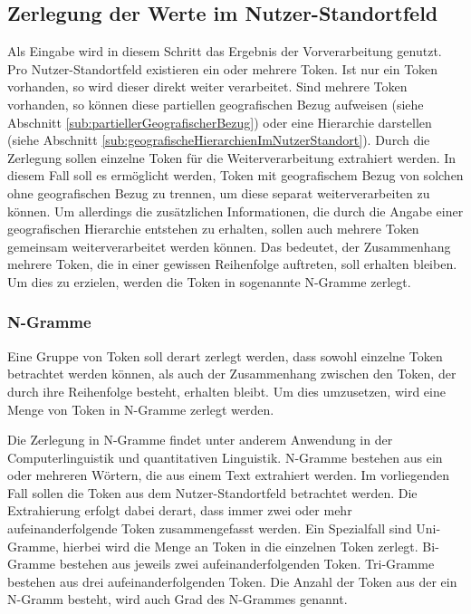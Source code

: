 		\subsection{Zerlegung der Werte im Nutzer-Standortfeld} \label{sub:VorvNGramme}

			Als Eingabe wird in diesem Schritt das Ergebnis der Vorverarbeitung genutzt. 
			Pro Nutzer-Standortfeld existieren ein oder mehrere Token. 
			Ist nur ein Token vorhanden, so wird dieser direkt weiter verarbeitet.
			Sind mehrere Token vorhanden, so können diese partiellen geografischen Bezug aufweisen (siehe Abschnitt \ref{sub:partiellerGeografischerBezug}) oder eine Hierarchie darstellen (siehe Abschnitt \ref{sub:geografischeHierarchienImNutzerStandort}).
			Durch die Zerlegung sollen einzelne Token für die Weiterverarbeitung extrahiert werden.
			In diesem Fall soll es ermöglicht werden, Token mit geografischem Bezug von solchen ohne geografischen Bezug zu trennen, um diese separat weiterverarbeiten zu können.
			Um allerdings die zusätzlichen Informationen, die durch die Angabe einer geografischen Hierarchie entstehen zu erhalten, sollen auch mehrere Token gemeinsam weiterverarbeitet werden können.
			Das bedeutet, der Zusammenhang mehrere Token, die in einer gewissen Reihenfolge auftreten, soll erhalten bleiben. 
			Um dies zu erzielen, werden die Token in sogenannte N-Gramme zerlegt. 

			\subsubsection{N-Gramme} 

				Eine Gruppe von Token soll derart zerlegt werden, dass sowohl einzelne Token betrachtet werden können, als auch der Zusammenhang zwischen den Token, der durch ihre Reihenfolge  besteht, erhalten bleibt.
				Um dies umzusetzen, wird eine Menge von Token in N-Gramme zerlegt werden.

				Die Zerlegung in N-Gramme findet unter anderem Anwendung in der Computerlinguistik und quantitativen Linguistik.
				N-Gramme bestehen aus ein oder mehreren Wörtern, die aus einem Text extrahiert werden. 
				Im vorliegenden Fall sollen die Token aus dem Nutzer-Standortfeld betrachtet werden.
				Die Extrahierung erfolgt dabei derart, dass immer zwei oder mehr aufeinanderfolgende Token zusammengefasst werden.    
				Ein Spezialfall sind Uni-Gramme, hierbei wird die Menge an Token in die einzelnen Token zerlegt.
				Bi-Gramme bestehen aus jeweils zwei aufeinanderfolgenden Token.
				Tri-Gramme bestehen aus drei aufeinanderfolgenden Token. 
				Die Anzahl der Token aus der ein N-Gramm besteht, wird auch Grad des N-Grammes genannt.

